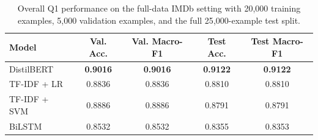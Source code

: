 \begin{table}[H]
\centering
\small
\begin{tabular}{lcccc}
\toprule
Model & Val. Acc. & Val. Macro-F1 & Test Acc. & Test Macro-F1 \\
\midrule
DistilBERT & \textbf{0.9016} & \textbf{0.9016} & \textbf{0.9122} & \textbf{0.9122} \\
TF-IDF + LR & 0.8836 & 0.8836 & 0.8810 & 0.8810 \\
TF-IDF + SVM & 0.8886 & 0.8886 & 0.8791 & 0.8791 \\
BiLSTM & 0.8532 & 0.8532 & 0.8355 & 0.8353 \\
\bottomrule
\end{tabular}
\caption{Overall Q1 performance on the full-data IMDb setting with 20{,}000 training examples, 5{,}000 validation examples, and the full 25{,}000-example test split.}
\label{tab:q1_overall_results}
\end{table}